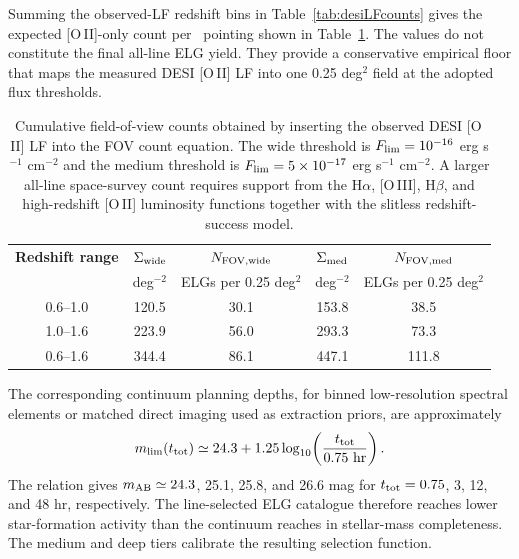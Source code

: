Summing the observed-LF redshift bins in Table~\ref{tab:desiLFcounts} gives the expected [O\,II]-only count per \fovlarge\ pointing shown in Table~\ref{tab:desiFOVsum}. The values do not constitute the final all-line ELG yield. They provide a conservative empirical floor that maps the measured DESI [O\,II] LF into one 0.25 deg$^2$ field at the adopted flux thresholds.

\begin{table}[htbp]
\centering
\sffamily\small
\begin{tabularx}{\textwidth}{@{}c c c c c@{}}
\toprule
\textbf{Redshift range} & \textbf{$\Sigma_{\rm wide}$} & \textbf{$N_{\rm FOV,wide}$} & \textbf{$\Sigma_{\rm med}$} & \textbf{$N_{\rm FOV,med}$}\\
 & deg$^{-2}$ & ELGs per 0.25 deg$^2$ & deg$^{-2}$ & ELGs per 0.25 deg$^2$\\
\midrule
0.6--1.0 & 120.5 & 30.1 & 153.8 & 38.5\\
1.0--1.6 & 223.9 & 56.0 & 293.3 & 73.3\\
0.6--1.6 & 344.4 & 86.1 & 447.1 & 111.8\\
\bottomrule
\end{tabularx}
\caption{Cumulative field-of-view counts obtained by inserting the observed DESI [O\,II] LF into the FOV count equation. The wide threshold is $F_{\rm lim}=10^{-16}$ erg s$^{-1}$ cm$^{-2}$ and the medium threshold is $F_{\rm lim}=5\times10^{-17}$ erg s$^{-1}$ cm$^{-2}$. A larger all-line space-survey count requires support from the H$\alpha$, [O\,III], H$\beta$, and high-redshift [O\,II] luminosity functions together with the slitless redshift-success model.}
\label{tab:desiFOVsum}
\end{table}

The corresponding continuum planning depths, for binned low-resolution spectral elements or matched direct imaging used as extraction priors, are approximately
\begin{equation}
  m_{\rm lim}(t_{\rm tot})\simeq24.3+
  1.25\log_{10}\!\left(\frac{t_{\rm tot}}{0.75\ {\rm hr}}\right).
\end{equation}
The relation gives $m_{\rm AB}\simeq24.3$, 25.1, 25.8, and 26.6 mag for $t_{\rm tot}=0.75$, 3, 12, and 48 hr, respectively. The line-selected ELG catalogue therefore reaches lower star-formation activity than the continuum reaches in stellar-mass completeness. The medium and deep tiers calibrate the resulting selection function.


